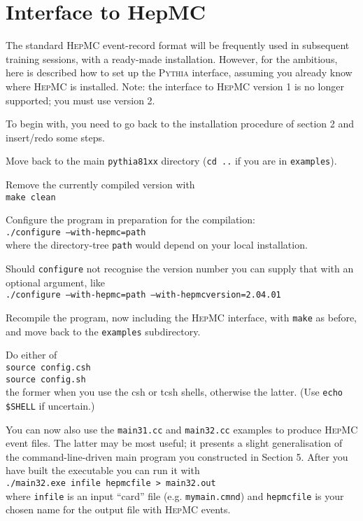 \documentclass[12pt,a4paper]{article}
\newcounter{enumct}
\newenvironment{Enumerate}{\begin{list}{\arabic{enumct}.}%
{\usecounter{enumct}\setlength{\topsep}{0.4mm}%
\setlength{\partopsep}{0.4mm}\setlength{\itemsep}{0.4mm}%
\setlength{\parsep}{0.4mm}}}{\end{list}}
\begin{document}
\section{Interface to HepMC}

The standard \textsc{HepMC} event-record format will be frequently used 
in subsequent training sessions, with a ready-made installation. However, 
for the ambitious, here is described how to set up the \textsc{Pythia} 
interface, assuming you already know where \textsc{HepMC} is installed.
Note: the interface to \textsc{HepMC} version 1 is no longer supported; 
you must use version 2.

To begin with, you need to go back to the installation procedure 
of section 2 and insert/redo some steps.
\begin{Enumerate}
\item Move back to the main \texttt{pythia81xx} directory 
(\texttt{cd ..} if you are in \texttt{examples}).
\item Remove the currently compiled version with\\
\hspace*{10mm}\texttt{make clean}
\item Configure the program in preparation for the compilation:\\
\hspace*{10mm}\texttt{./configure --with-hepmc=path}\\
where the directory-tree \texttt{path} would depend on your local 
installation. 
\item Should \texttt{configure} not recognise the version number 
you can supply that with an optional argument, like\\
\hspace*{10mm}\texttt{./configure --with-hepmc=path --with-hepmcversion=2.04.01}
\item Recompile the program, now including the \textsc{HepMC} interface, 
with \texttt{make} as before, and move back to the \texttt{examples} 
subdirectory. 
\item Do either of\\
\hspace*{10mm}\texttt{source config.csh}\\
\hspace*{10mm}\texttt{source config.sh}\\
the former when you use the csh or tcsh shells, otherwise the latter.
(Use \texttt{echo \$SHELL} if uncertain.)  
\item You can now also use the \texttt{main31.cc} and \texttt{main32.cc}
examples to produce \textsc{HepMC} event files. The latter may be most useful;
it presents a slight generalisation of the command-line-driven main program
you constructed in Section 5. After you have built the executable you can 
run it with\\ 
\hspace*{10mm}\texttt{./main32.exe infile hepmcfile > main32.out}\\
where \texttt{infile} is an input ``card'' file (e.g. \texttt{mymain.cmnd})
and \texttt{hepmcfile} is your chosen name for the output file with 
\textsc{HepMC} events.
\end{Enumerate}
\end{document}
